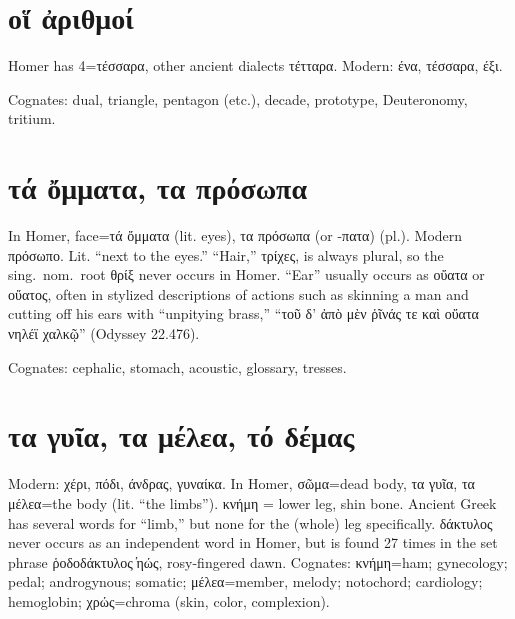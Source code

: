 \documentclass[12pt,openany]{book}
\newenvironment{notes}{\vfill\scriptsize\begin{flushright}}{\end{flushright}}
\newcommand{\fig}[1]{\begin{center}\end{center}}
\begin{document}

\chapter{οἵ ἀριθμοί}

\fig{numbers/numbers.svg}

\begin{notes}
Homer has 4=τέσσαρα, other ancient dialects τέτταρα.
Modern: ένα, τέσσαρα, έξι.

Cognates: dual, triangle, pentagon (etc.), decade,
prototype, Deuteronomy, tritium.
\end{notes}


\chapter{τά ὄμματα, τα πρόσωπα}

\fig{face/face.svg}

\begin{notes}
In Homer, face=τά ὄμματα (lit. eyes), τα πρόσωπα (or -πατα) (pl.).
Modern πρόσωπο. Lit. ``next to the eyes.''
``Hair,'' τρίχες, is always plural, so the sing.~nom.~root θρίξ never occurs in Homer.
``Ear'' usually occurs as οὔατα or οὔατος, often in stylized descriptions of actions such as
skinning a man and cutting off his ears with ``unpitying brass,'' ``τοῦ δ' ἀπὸ μὲν ῥῖνάς τε καὶ οὔατα νηλέϊ χαλκῷ'' (Odyssey 22.476).


Cognates: cephalic, stomach,
acoustic, glossary, tresses.
\end{notes}


\chapter{τα γυῖα, τα μέλεα, τό δέμας}

\fig{body/body.svg}

\begin{notes}
Modern: χέρι, πόδι, άνδρας, γυναίκα. In Homer, σῶμα=dead body, τα γυῖα, τα μέλεα=the body (lit. ``the limbs'').
κνήμη = lower leg, shin bone. Ancient Greek has several words for ``limb,'' but none for the (whole) leg specifically.
δάκτυλος never occurs as an independent word in Homer, but is found 27 times in the
set phrase ῥοδοδάκτυλος ̓ηώς, rosy-fingered dawn. Cognates: κνήμη=ham; gynecology; pedal; androgynous; somatic; μέλεα=member, melody;
notochord; cardiology; hemoglobin; χρώς=chroma (skin, color, complexion).
\end{notes}
\end{document}
